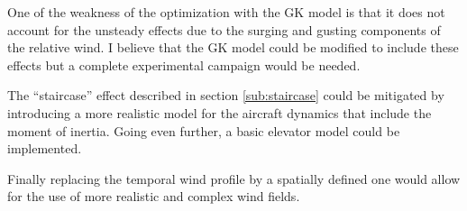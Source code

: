 
\par One of the weakness of the optimization with the GK model is that it does not account for the unsteady effects due to the surging and gusting components of the relative wind.
I believe that the GK model could be modified to include these effects but a complete experimental campaign would be needed.

\par The ``staircase'' effect described in section \ref{sub:staircase} could be mitigated by introducing a more realistic model for the aircraft dynamics that include the moment of inertia.
Going even further, a basic elevator model could be implemented.

\par Finally replacing the temporal wind profile by a spatially defined one would allow for the use of more realistic and complex wind fields.

